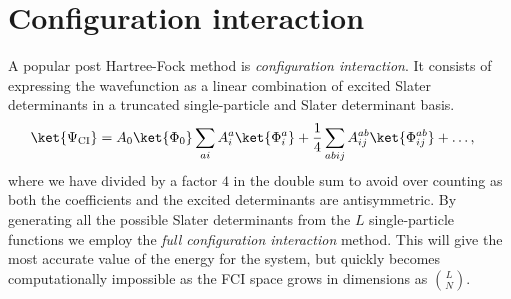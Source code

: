 \chapter{Configuration interaction}
     A popular post Hartree-Fock method is \textit{configuration interaction}.
     It consists of expressing the wavefunction as a linear combination of
     excited Slater determinants in a truncated single-particle and Slater
     determinant basis.
     \begin{align}
         \ket{\Psi_{\text{CI}}}
         &= A_0\ket{\Phi_0}
         \sum_{ai}A^a_i\ket{\Phi^a_i}
         + \frac{1}{4}\sum_{abij}A^{ab}_{ij}\ket{\Phi^{ab}_{ij}}
         + \dots,
     \end{align}
     where we have divided by a factor $4$ in the double sum to avoid over
     counting as both the coefficients and the excited determinants are
     antisymmetric. By generating all the possible Slater determinants from the
     $L$ single-particle functions we employ the \textit{full configuration
     interaction} method. This will give the most accurate value of the energy
     for the system, but quickly becomes computationally impossible as the FCI
     space grows in dimensions as $\binom{L}{N}$.
